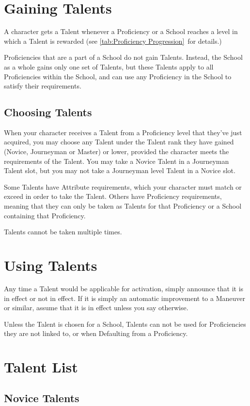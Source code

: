\documentclass[oneside,11pt,english]{book}
\begin{document}
\section{Gaining Talents}
A character gets a Talent whenever a Proficiency or a School reaches a level in which a Talent is 
rewarded (see \autoref{tab:Proficiency Progression}~for details.)

Proficiencies that are a part of a School do not gain Talents. Instead, the School as a whole gains only one 
set of Talents, but these Talents apply to all Proficiencies within the School, and can use any Proficiency 
in the School to satisfy their requirements. 

\subsection{Choosing Talents}
When your character receives a Talent from a Proficiency level that they’ve just acquired, you may choose any Talent under the Talent rank they have gained (Novice, Journeyman or Master) or lower, provided the character meets the requirements of the Talent. You may take a Novice Talent in a Journeyman Talent slot, but you may not take a Journeyman level Talent in a Novice slot.

Some Talents have Attribute requirements, which your character must match or exceed in order to take the Talent. Others have Proficiency requirements, meaning that they can only be taken as Talents for that Proficiency or a School containing that Proficiency.

Talents cannot be taken multiple times.

\section{Using Talents}
Any time a Talent would be applicable for activation, simply announce that it is in effect or not in effect.
If it is simply an automatic improvement to a Maneuver or similar, assume that it is in effect unless you say otherwise. 

Unless the Talent is chosen for a School, Talents can not be used for Proficiencies they are not linked to, or when Defaulting from a Proficiency. 

\section{Talent List}
\subsection{Novice Talents}
\end{document}
